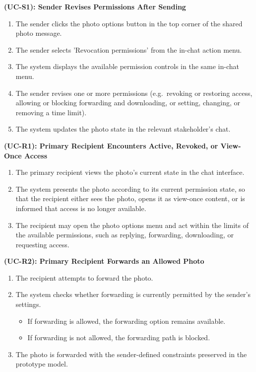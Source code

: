 \textbf{(UC-S1): Sender Revises Permissions After Sending}
\begin{enumerate}
    \item The sender clicks the photo options button in the top corner of the shared photo message.
    \item The sender selects 'Revocation permissions' from the in-chat action menu.
    \item The system displays the available permission controls in the same in-chat menu.
    \item The sender revises one or more permissions (e.g.\ revoking or restoring access, allowing or blocking forwarding and downloading, or setting, changing, or removing a time limit).
    \item The system updates the photo state in the relevant stakeholder's chat.

\end{enumerate}

\textbf{(UC-R1): Primary Recipient Encounters Active, Revoked, or View-Once Access}
\begin{enumerate}
    \item The primary recipient views the photo's current state in the chat interface.
    \item The system presents the photo according to its current permission state, so that the recipient either sees the photo, opens it as view-once content, or is informed that access is no longer available.
    \item The recipient may open the photo options menu and act within the limits of the available permissions, such as replying, forwarding, downloading, or requesting access.
\end{enumerate}

\textbf{(UC-R2): Primary Recipient Forwards an Allowed Photo}
\begin{enumerate}
    \item The recipient attempts to forward the photo.
    \item The system checks whether forwarding is currently permitted by the sender's settings.
    \begin{itemize}
        \item If forwarding is allowed, the forwarding option remains available.
        \item If forwarding is not allowed, the forwarding path is blocked.
    \end{itemize}
    \item The photo is forwarded with the sender-defined constraints preserved in the prototype model.
\end{enumerate}

